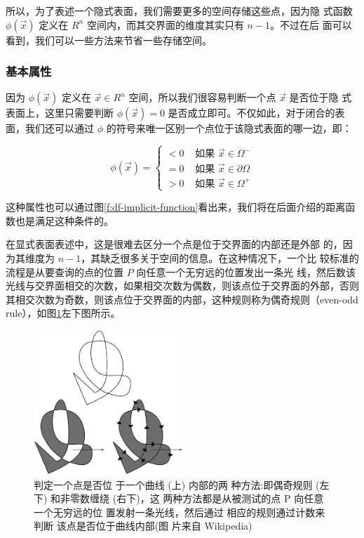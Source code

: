 所以，为了表述一个隐式表面，我们需要更多的空间存储这些点，因为隐 式函数 $\phi(\vec{x})$ 定义在 $R^{n}$ 空间内，而其交界面的维度其实只有 $n − 1$。不过在后 面可以看到，我们可以一些方法来节省一些存储空间。




\subsubsection{基本属性}
因为 $\phi(\vec{x})$ 定义在 $\vec{x} \in R^{n}$ 空间，所以我们很容易判断一个点 $\vec{x}$ 是否位于隐 式表面上，这里只需要判断 $\phi(\vec{x}) = 0$ 是否成立即可。不仅如此，对于闭合的表 面，我们还可以通过 $\phi$ 的符号来唯一区别一个点位于该隐式表面的哪一边，即：

\begin{equation}
	\phi(\vec{x})=\begin{cases}
		<0 & \text{~如果~} \vec{x}\in\Omega^{-}\\
		=0 & \text{~如果~} \vec{x}\in\partial\Omega\\
		>0 & \text{~如果~} \vec{x}\in\Omega^{+}
	\end{cases}
\end{equation}

这种属性也可以通过图\ref{f:df-implicit-function}看出来，我们将在后面介绍的距离函数也是满足这种条件的。

在显式表面表述中，这是很难去区分一个点是位于交界面的内部还是外部 的，因为其维度为 $n − 1$，其缺乏很多关于空间的信息。在这种情况下，一个比 较标准的流程是从要查询的点的位置 $P$ 向任意一个无穷远的位置发出一条光 线，然后数该光线与交界面相交的次数，如果相交次数为偶数，则该点位于交界面的外部，否则其相交次数为奇数，则该点位于交界面的内部，这种规则称为偶奇规则（even-odd rule），如图\ref{f:df-non-zero_winding}左下图所示。

\begin{figure}
	\sidecaption
	\includegraphics[width=0.5\textwidth]{figures/df/Even-odd_and_non-zero_winding_fill_rules}
	\caption{判定一个点是否位 于一个曲线 (上) 内部的两 种方法:即偶奇规则 (左下) 和非零数缠绕 (右下)，这 两种方法都是从被测试的点 P 向任意一个无穷远的位 置发射一条光线，然后通过 相应的规则通过计数来判断 该点是否位于曲线内部(图 片来自 Wikipedia)}
	\label{f:df-non-zero_winding}
\end{figure}

